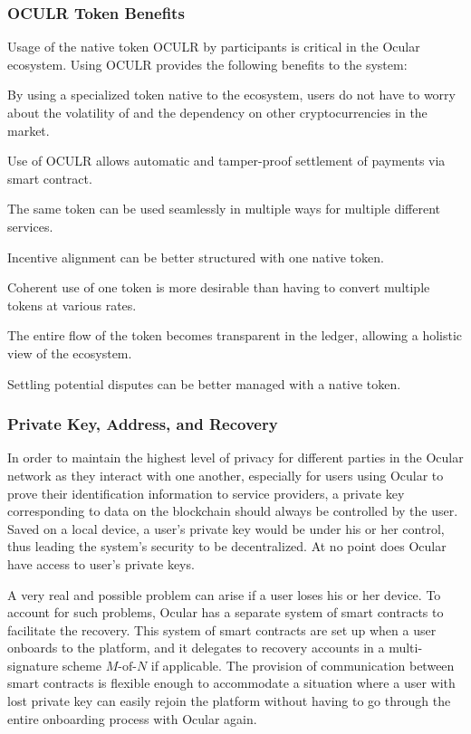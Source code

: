 \documentclass[a4paper]{article}
\let\tempone\itemize
\let\temptwo\enditemize
\renewenvironment{itemize}{\tempone\addtolength{\itemsep}{-5pt}}{\temptwo}
\begin{document}
\subsubsection*{OCULR Token Benefits}
Usage of the native token OCULR by participants is critical in the Ocular ecosystem. Using OCULR provides the following benefits to the system:
\begin{itemize}
\item By using a specialized token native to the ecosystem, users do not have to worry about the volatility of and the dependency on other cryptocurrencies in the market.
\item Use of OCULR allows automatic and tamper-proof settlement of payments via smart contract.
\item The same token can be used seamlessly in multiple ways for multiple different services.
\item Incentive alignment can be better structured with one native token.
\item Coherent use of one token is more desirable than having to convert multiple tokens at various rates.
\item The entire flow of the token becomes transparent in the ledger, allowing a holistic view of the ecosystem.
\item Settling potential disputes can be better managed with a native token.
\end{itemize}

\subsubsection*{Private Key, Address, and Recovery}
In order to maintain the highest level of privacy for different parties in the Ocular network as they interact with one another, especially for users using Ocular to prove their identification information to service providers, a private key corresponding to data on the blockchain should always be controlled by the user. Saved on a local device, a user's private key would be under his or her control, thus leading the system's security to be decentralized. At no point does Ocular have access to user's private keys. 

A very real and possible problem can arise if a user loses his or her device. To account for such problems, Ocular has a separate system of smart contracts to facilitate the recovery. This system of smart contracts are set up when a user onboards to the platform, and it delegates to recovery accounts in a multi-signature scheme $M\text{-of-}N$ if applicable. The provision of communication between smart contracts is flexible enough to accommodate a situation where a user with lost private key can easily rejoin the platform without having to go through the entire onboarding process with Ocular again.
\end{document}
